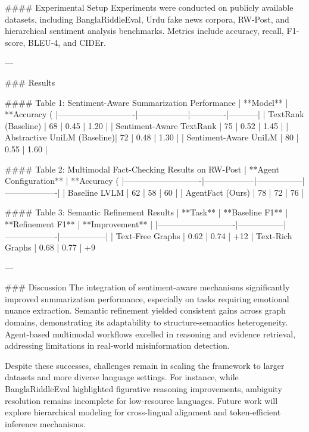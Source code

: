 #### Experimental Setup
Experiments were conducted on publicly available datasets, including BanglaRiddleEval, Urdu fake news corpora, RW-Post, and hierarchical sentiment analysis benchmarks. Metrics include accuracy, recall, F1-score, BLEU-4, and CIDEr.

---

### Results

#### Table 1: Sentiment-Aware Summarization Performance
| **Model**                  | **Accuracy (%
|----------------------------|------------------|-------------|-----------|  
| TextRank (Baseline)         | 68               | 0.45        | 1.20      |  
| Sentiment-Aware TextRank    | 75               | 0.52        | 1.45      |  
| Abstractive UniLM (Baseline)| 72               | 0.48        | 1.30      |  
| Sentiment-Aware UniLM       | 80               | 0.55        | 1.60      |  

#### Table 2: Multimodal Fact-Checking Results on RW-Post
| **Agent Configuration**    | **Accuracy (%
|----------------------------|------------------|-----------------|-------------------|  
| Baseline LVLM              | 62               | 58              | 60                |  
| AgentFact (Ours)           | 78               | 72              | 76                |  

#### Table 3: Semantic Refinement Results  
| **Task**                   | **Baseline F1** | **Refinement F1** | **Improvement** |  
|----------------------------|-----------------|-------------------|-----------------|  
| Text-Free Graphs           | 0.62            | 0.74              | +12%
| Text-Rich Graphs           | 0.68            | 0.77              | +9%

---

### Discussion
The integration of sentiment-aware mechanisms significantly improved summarization performance, especially on tasks requiring emotional nuance extraction. Semantic refinement yielded consistent gains across graph domains, demonstrating its adaptability to structure-semantics heterogeneity. Agent-based multimodal workflows excelled in reasoning and evidence retrieval, addressing limitations in real-world misinformation detection.

Despite these successes, challenges remain in scaling the framework to larger datasets and more diverse language settings. For instance, while BanglaRiddleEval highlighted figurative reasoning improvements, ambiguity resolution remains incomplete for low-resource languages. Future work will explore hierarchical modeling for cross-lingual alignment and token-efficient inference mechanisms.


